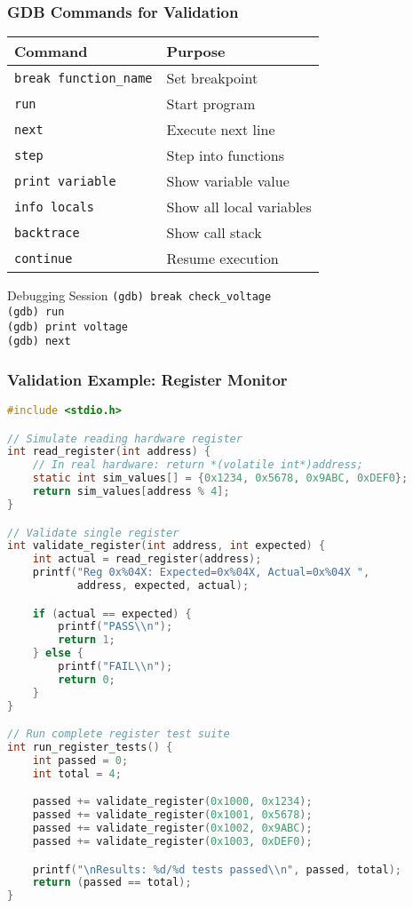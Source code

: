 \documentclass{beamer}
\begin{document}
\begin{frame}[fragile]
\frametitle{GDB Commands for Validation}
\begin{center}
\begin{tabular}{|l|l|}
\hline
\textbf{Command} & \textbf{Purpose} \\
\hline
\texttt{break function\_name} & Set breakpoint \\
\texttt{run} & Start program \\
\texttt{next} & Execute next line \\
\texttt{step} & Step into functions \\
\texttt{print variable} & Show variable value \\
\texttt{info locals} & Show all local variables \\
\texttt{backtrace} & Show call stack \\
\texttt{continue} & Resume execution \\
\hline
\end{tabular}
\end{center}

\vspace{0.5cm}
\begin{exampleblock}{Debugging Session}
\texttt{(gdb) break check\_voltage}\\
\texttt{(gdb) run}\\
\texttt{(gdb) print voltage}\\
\texttt{(gdb) next}
\end{exampleblock}
\end{frame}

\begin{frame}[fragile]
\frametitle{Validation Example: Register Monitor}
\begin{lstlisting}[language=C, basicstyle=\tiny]
#include <stdio.h>

// Simulate reading hardware register
int read_register(int address) {
    // In real hardware: return *(volatile int*)address;
    static int sim_values[] = {0x1234, 0x5678, 0x9ABC, 0xDEF0};
    return sim_values[address % 4];
}

// Validate single register
int validate_register(int address, int expected) {
    int actual = read_register(address);
    printf("Reg 0x%04X: Expected=0x%04X, Actual=0x%04X ",
           address, expected, actual);

    if (actual == expected) {
        printf("PASS\\n");
        return 1;
    } else {
        printf("FAIL\\n");
        return 0;
    }
}

// Run complete register test suite
int run_register_tests() {
    int passed = 0;
    int total = 4;

    passed += validate_register(0x1000, 0x1234);
    passed += validate_register(0x1001, 0x5678);
    passed += validate_register(0x1002, 0x9ABC);
    passed += validate_register(0x1003, 0xDEF0);

    printf("\nResults: %d/%d tests passed\\n", passed, total);
    return (passed == total);
}
\end{lstlisting}
\end{frame}
\end{document}
